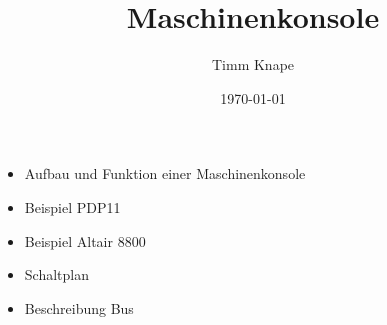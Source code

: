 \documentclass[a5paper,ngerman]{article}
\title{\color{emph}Maschinenkonsole}
\author{Timm Knape}
\date{\today}
\begin{document}
\pagecolor{background}
\color{normal}
\allsectionsfont{\color{emph}\mdseries}
\pagestyle{plain}
\maketitle
\thispagestyle{fancy}

\begin{itemize}
\item Aufbau und Funktion einer Maschinenkonsole
\item Beispiel PDP11
\item Beispiel Altair 8800
\item Schaltplan
\item Beschreibung Bus
\end{itemize}
\end{document}
